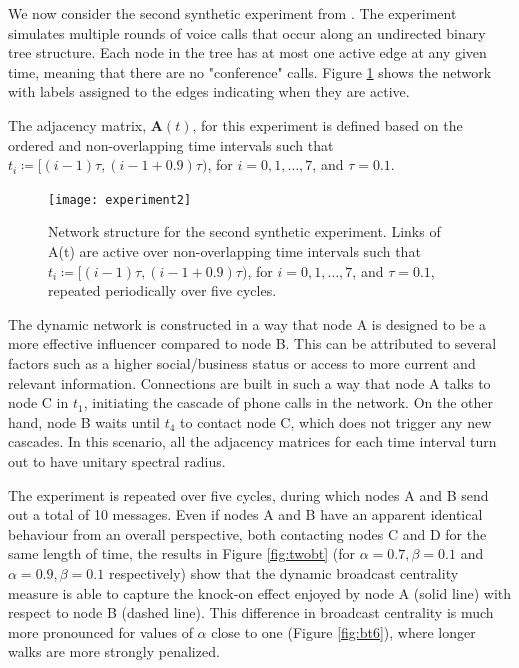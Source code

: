 \newpage
We now consider the second synthetic experiment from \cite{grindrod2014dynamical}. The experiment simulates multiple rounds of voice calls that occur along an undirected binary tree structure. Each node in the tree has at most one active edge at any given time, meaning that there are no "conference" calls.  Figure \ref{fig:exp2} shows the network with labels assigned to the edges indicating when they are active. 

The adjacency matrix, $\mathbf{A}(t)$, for this experiment is defined based on the ordered and non-overlapping time intervals such that $t_i\coloneqq[(i − 1)\tau , (i − 1 + 0.9)\tau )$, for $i=0, 1, \dots , 7$, and $\tau =0.1$.

\begin{figure}[h]\centering
    \texttt{[image: experiment2]}
    \caption{Network structure for the second synthetic experiment. Links of A(t) are active over non-overlapping time intervals such that $t_i\coloneqq[(i − 1)\tau , (i − 1 + 0.9)\tau )$, for $i=0, 1, \dots , 7$, and $\tau =0.1$, repeated periodically over five cycles.}
    \label{fig:exp2}
    \bigskip
\end{figure}

The dynamic network is constructed in a way that node A is designed to be a more effective influencer compared to node B. This can be attributed to several factors such as a higher social/business status or access to more current and relevant information. Connections are built in such a way that node A talks to node C in $t_1$, initiating the cascade of phone calls in the network. On the other hand, node B waits until $t_4$ to contact node C, which does not trigger any new cascades. In this scenario, all the adjacency matrices for each time interval turn out to have unitary spectral radius.

The experiment is repeated over five cycles, during which nodes A and B send out a total of 10 messages. Even if nodes A and B have an apparent identical behaviour from an overall perspective, both contacting nodes C and D for the same length of time, the results in Figure \ref{fig:twobt} (for $\alpha = 0.7, \beta = 0.1$ and $\alpha = 0.9 , \beta = 0.1$ respectively) show that the dynamic broadcast centrality measure is able to capture the knock-on effect enjoyed by node A (solid line) with respect to node B (dashed line). This difference in broadcast centrality is much more pronounced for values of $\alpha$ close to one (Figure \ref{fig:bt6}), where longer walks are more strongly penalized.

